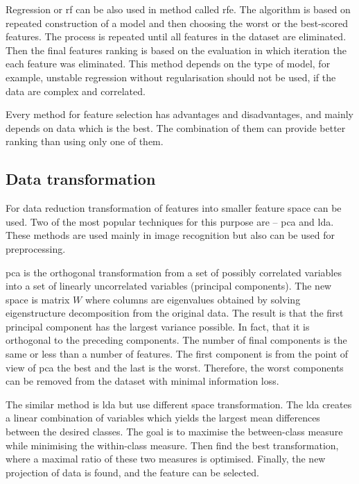 \documentclass[thesis=M,english]{FITthesis}[2012/10/20]
\begin{document}
Regression or \gls{rf} can be also used in method called \gls{rfe}. The algorithm is based on repeated construction of a model and then choosing the worst or the best-scored features. The process is repeated until all features in the dataset are eliminated. Then the final features ranking is based on the evaluation in which iteration the each feature was eliminated. This method depends on the type of model, for example, unstable regression without regularisation should not be used, if the data are complex and correlated.\cite{Saabas2014all} 

Every method for feature selection has advantages and disadvantages, and mainly depends on data which is the best. The combination of them can provide better ranking than using only one of them.

\subsection{Data transformation}

For data reduction transformation of features into smaller feature space can be used. Two of the most popular techniques for this purpose are -- \gls{pca} and \gls{lda}.\cite{Martinez2001pcalda} These methods are used mainly in image recognition but also can be used for preprocessing. 

\gls{pca} is the orthogonal transformation from a set of possibly correlated variables into a set of linearly uncorrelated variables (principal components). The new space is matrix $W$ where columns are eigenvalues obtained by solving eigenstructure decomposition from the original data.\cite{Martinez2001pcalda} The result is that the first principal component has the largest variance possible. In fact, that it is orthogonal to the preceding components. The number of final components is the same or less than a number of features. The first component is from the point of view of \gls{pca} the best and the last is the worst. Therefore, the worst components can be removed from the dataset with minimal information loss. 

The similar method is \gls{lda} but use different space transformation\cite{Martinez2001pcalda}. The \gls{lda} creates a linear combination of variables which yields the largest mean differences between the desired classes. The goal is to maximise the between-class measure while minimising the within-class measure. Then find the best transformation, where a maximal ratio of these two measures is optimised. Finally, the new projection of data is found, and the feature can be selected.
\end{document}
